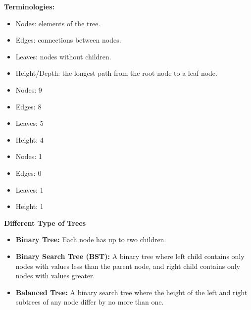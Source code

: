 \textbf{Terminologies:}
\begin{itemize}
    \item Nodes: elements of the tree.
    \item Edges: connections between nodes.
    \item Leaves: nodes without children.
    \item Height/Depth: the longest path from the root node to a leaf node.
\end{itemize}

\begin{itemize}
    \item Nodes: 9
    \item Edges: 8
    \item Leaves: 5
    \item Height: 4
\end{itemize}

\begin{itemize}
    \item Nodes: 1
    \item Edges: 0
    \item Leaves: 1
    \item Height: 1
\end{itemize}

\textbf{Different Type of Trees} \\

\begin{itemize}
    \item \textbf{Binary Tree:} Each node has up to two children.
    \item \textbf{Binary Search Tree (BST):} A binary tree where left child contains only nodes with values less than the parent node, and right child contains only nodes with values greater. 
    \item \textbf{Balanced Tree:} A binary search tree where the height of the left and right subtrees of any node differ by no more than one.
\end{itemize}

